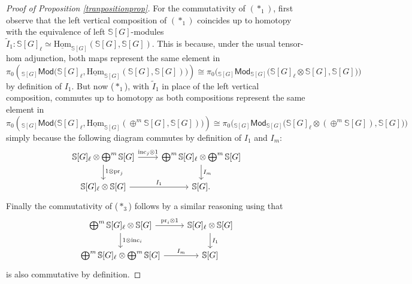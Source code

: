 \documentclass[a4paper, oneside]{amsart}
\newcommand{\1}{\mathds{1}}
\theoremstyle{remark}
\theoremstyle{definition}
\newcommand{\s}{\mathbb{S}}
\numberwithin{equation}{section}
\begin{document}
\begin{proof}[Proof of Proposition \ref{tranpositionprop}]
    For the commutativity of $(*_1)$, first observe that the left vertical composition of $(*_1)$ coincides up to homotopy with the equivalence of left $\s[G]$-modules $\widetilde{I}_1: \s[G]_\ell\simeq \underline{\mathrm{Hom}}_{\s[G]}(\s[G],\s[G])$. This is because, under the usual tensor-hom adjunction, both maps represent the same element in
    $$
\pi_0\left({}_{\s[G]}\mathsf{Mod}\big(\s[G]_\ell,\underline{\mathrm{Hom}}_{\s[G]}(\s[G],\s[G])\big)\right)\cong\pi_0\big({}_{\s[G]}\mathsf{Mod}_{\s[G]}\big(\s[G]_\ell\otimes \s[G],\s[G]\big)\big)
    $$
    by definition of $I_1$. But now ($*_1$), with $\widetilde{I}_1$ in place of the left vertical composition, commutes up to homotopy as both compositions represent the same element in
    $$
\pi_0\left({}_{\s[G]}\mathsf{Mod}\big(\s[G]_\ell,\underline{\mathrm{Hom}}_{\s[G]}(\oplus^m\s[G],\s[G])\big)\right)\cong\pi_0\big({}_{\s[G]}\mathsf{Mod}_{\s[G]}\big(\s[G]_\ell\otimes (\oplus^m\s[G]),\s[G]\big)\big)
    $$
    simply because the following diagram commutes by definition of $I_1$ and $I_m$:
    $$
\begin{tikzcd}
    \s[G]_\ell\otimes\bigoplus^m\s[G]\dar["1\otimes \mathrm{pr}_j"]\rar["\mathrm{inc}_j\otimes 1"] &\bigoplus^m\s[G]_\ell\otimes \bigoplus^m\s[G]\dar["I_m"]\\
    \s[G]_\ell\otimes \s[G]\rar["I_1"] & \s[G].
\end{tikzcd}
    $$
    Finally the commutativity of ($*_3$) follows by a similar reasoning using that
        $$
\begin{tikzcd}
    \bigoplus^m\s[G]_\ell\otimes\s[G]\dar["1\otimes\mathrm{inc}_i"]\rar["\mathrm{pr}_i\otimes 1"] &\s[G]_\ell\otimes \s[G]\dar["I_1"]\\
    \bigoplus^m\s[G]_\ell\otimes \bigoplus^m\s[G]\rar["I_m"] & \s[G]
\end{tikzcd}
    $$
    is also commutative by definition.
\end{proof}
\end{document}

